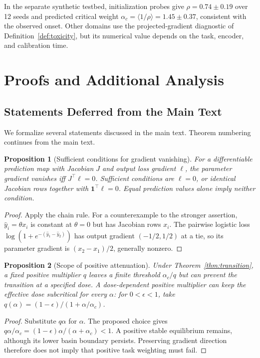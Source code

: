 \documentclass{article}
\newtheorem{proposition}{Proposition}
\begin{document}
In the separate synthetic testbed, initialization probes give $\rho=0.74\pm0.19$ over 12 seeds and predicted critical weight $\alpha_c=\langle1/\rho\rangle=1.45\pm0.37$, consistent with the observed onset. Other domains use the projected-gradient diagnostic of Definition~\ref{def:toxicity}, but its numerical value depends on the task, encoder, and calibration time.

\FloatBarrier
\section{Proofs and Additional Analysis}\label{app:proofs}

\subsection{Statements Deferred from the Main Text}
We formalize several statements discussed in the main text. Theorem numbering continues from the main text.


\begin{proposition}[Sufficient conditions for gradient vanishing]\label{prop:gradient_vanishing}
For a differentiable prediction map with Jacobian $J$ and output loss gradient $\ell$, the parameter gradient vanishes iff $J^\top\ell=0$. Sufficient conditions are $\ell=0$, or identical Jacobian rows together with $\mathbf1^\top\ell=0$. Equal prediction values alone imply neither condition.
\end{proposition}
\begin{proof}
Apply the chain rule. For a counterexample to the stronger assertion, $\hat y_i=\theta x_i$ is constant at $\theta=0$ but has Jacobian rows $x_i$. The pairwise logistic loss $\log(1+e^{-(\hat y_1-\hat y_2)})$ has output gradient $(-1/2,1/2)$ at a tie, so its parameter gradient is $(x_2-x_1)/2$, generally nonzero.
\end{proof}

\begin{proposition}[Scope of positive attenuation]\label{prop:minimality}
Under Theorem~\ref{thm:transition}, a fixed positive multiplier $q$ leaves a finite threshold $\alpha_c/q$ but can prevent the transition at a specified dose. A dose-dependent positive multiplier can keep the effective dose subcritical for every $\alpha$: for $0<\epsilon<1$, take $q(\alpha)=(1-\epsilon)/(1+\alpha/\alpha_c)$.
\end{proposition}
\begin{proof}
Substitute $q\alpha$ for $\alpha$. The proposed choice gives $q\alpha/\alpha_c=(1-\epsilon)\alpha/(\alpha+\alpha_c)<1$. A positive stable equilibrium remains, although its lower basin boundary persists. Preserving gradient direction therefore does not imply that positive task weighting must fail.
\end{proof}
\end{document}
